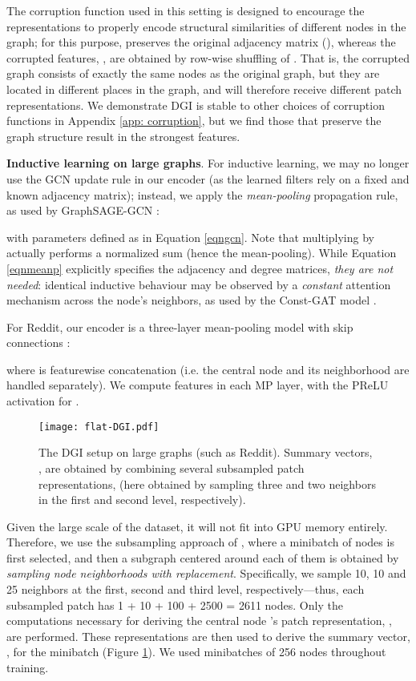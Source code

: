 \documentclass{article} \usepackage{iclr2019_conference,times}
\newcommand{\xhdr}[1]{{\noindent\bfseries #1}.}
\begin{document}
The corruption function used in this setting is designed to encourage the representations to properly encode structural similarities of different nodes in the graph; for this purpose,  preserves the original adjacency matrix (), whereas the corrupted features, , are obtained by row-wise shuffling of . That is, the corrupted graph consists of exactly the same nodes as the original graph, but they are located in different places in the graph, and will therefore receive different patch representations.  We demonstrate DGI is stable to other choices of corruption functions in Appendix \ref{app: corruption}, but we find those that preserve the graph structure result in the strongest features.

\xhdr{Inductive learning on large graphs}
For inductive learning, we may no longer use the GCN update rule in our encoder (as the learned filters rely on a fixed and known adjacency matrix); instead, we apply the \emph{mean-pooling} propagation rule, as used by GraphSAGE-GCN \citep{hamilton2017inductive}:
 
with parameters defined as in Equation \ref{eqngcn}. Note that multiplying by  actually performs a normalized sum (hence the mean-pooling). While Equation \ref{eqnmeanp} explicitly specifies the adjacency and degree matrices, \emph{they are not needed}: identical inductive behaviour may be observed by a \emph{constant} attention mechanism across the node's neighbors, as used by the Const-GAT model \citep{velickovic2018graph}.

For Reddit, our encoder is a three-layer mean-pooling model with skip connections \citep{he2016deep}:

where  is featurewise concatenation (i.e. the central node and its neighborhood are handled separately). We compute  features in each MP layer, with the PReLU activation for .
\begin{figure}
    \centering
    \texttt{[image: flat-DGI.pdf]}
    \caption{The DGI setup on large graphs (such as Reddit). Summary vectors, , are obtained by combining several subsampled patch representations,  (here obtained by sampling three and two neighbors in the first and second level, respectively).}
    \label{fig:subdgi}
\end{figure}

Given the large scale of the dataset, it will not fit into GPU memory entirely. Therefore, we use the subsampling approach of \cite{hamilton2017inductive}, where a minibatch of nodes is first selected, and then a subgraph centered around each of them is obtained by \emph{sampling node neighborhoods with replacement}. Specifically, we sample 10, 10 and 25 neighbors at the first, second and third level, respectively---thus, each subsampled patch has 1 + 10 + 100 + 2500 = 2611 nodes. Only the computations necessary for deriving the central node 's patch representation, , are performed. These representations are then used to derive the summary vector, , for the minibatch (Figure \ref{fig:subdgi}). We used minibatches of 256 nodes throughout training.
\end{document}
